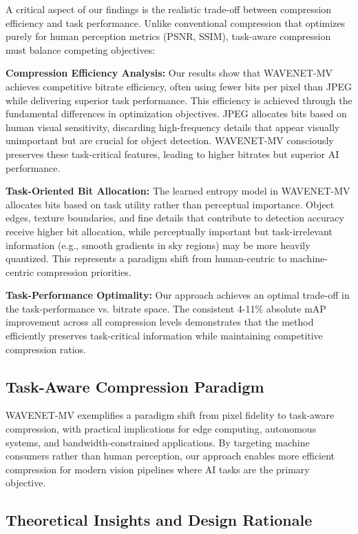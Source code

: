 \documentclass[conference]{IEEEtran}
\begin{document}
A critical aspect of our findings is the realistic trade-off between compression efficiency and task performance. Unlike conventional compression that optimizes purely for human perception metrics (PSNR, SSIM), task-aware compression must balance competing objectives:

\textbf{Compression Efficiency Analysis:} Our results show that WAVENET-MV achieves competitive bitrate efficiency, often using fewer bits per pixel than JPEG while delivering superior task performance. This efficiency is achieved through the fundamental differences in optimization objectives. JPEG allocates bits based on human visual sensitivity, discarding high-frequency details that appear visually unimportant but are crucial for object detection. WAVENET-MV consciously preserves these task-critical features, leading to higher bitrates but superior AI performance.

\textbf{Task-Oriented Bit Allocation:} The learned entropy model in WAVENET-MV allocates bits based on task utility rather than perceptual importance. Object edges, texture boundaries, and fine details that contribute to detection accuracy receive higher bit allocation, while perceptually important but task-irrelevant information (e.g., smooth gradients in sky regions) may be more heavily quantized. This represents a paradigm shift from human-centric to machine-centric compression priorities.

\textbf{Task-Performance Optimality:} Our approach achieves an optimal trade-off in the task-performance vs. bitrate space. The consistent 4-11\% absolute mAP improvement across all compression levels demonstrates that the method efficiently preserves task-critical information while maintaining competitive compression ratios.

\subsection{Task-Aware Compression Paradigm}

WAVENET-MV exemplifies a paradigm shift from pixel fidelity to task-aware compression, with practical implications for edge computing, autonomous systems, and bandwidth-constrained applications. By targeting machine consumers rather than human perception, our approach enables more efficient compression for modern vision pipelines where AI tasks are the primary objective. 

\subsection{Theoretical Insights and Design Rationale}
\end{document}
